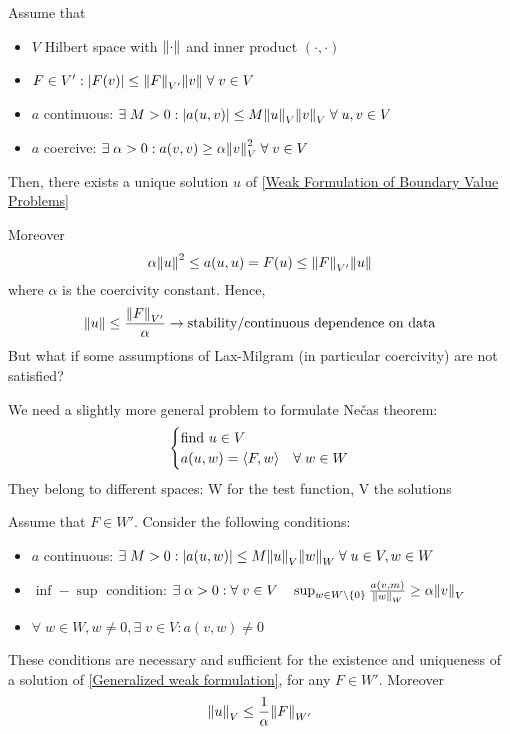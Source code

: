 \begin{theorem}
    Assume that 
    \begin{itemize}
        \item \(V\) Hilbert space with \(\norm{\cdot}\) and inner product \((\cdot, \cdot)\)
        \item \(F \in V': \abs{F(v)} \leq \norm{F}_{V'}\norm{v} \; \forall \; v \in V\)
        \item \(a\) continuous: \(\exists \; M > 0: \abs{a(u,v)} \leq M \norm{u}_V\norm{v}_V \; \forall \; u,v \in V\)
        \item \(a\) coercive: \(\exists \; \alpha > 0: a(v,v) \geq \alpha\norm{v}_V^2 \; \forall \; v \in V\)
    \end{itemize}
    Then, there exists a unique solution \(u\) of \eqref{Weak Formulation of Boundary Value Problems}
\end{theorem}
Moreover 
\[
    \alpha \norm{u}^2 \leq a(u,u) = F(u) \leq \norm{F}_{V'} \norm{u}
\]
where \(\alpha\) is the coercivity constant. Hence,
\[
    \norm{u} \leq \frac{\norm{F}_{V'}}{\alpha} \to \text{stability/continuous dependence on data}
\]
But what if some assumptions of Lax-Milgram (in particular coercivity) are not satisfied?

We need a slightly more general problem to formulate Nečas theorem:
\begin{equation}
    \begin{cases}
        \text{find } u \in V \\
        a(u,w) = \langle F,w \rangle & \forall \; w \in W \label{Generalized weak formulation}
    \end{cases}
\end{equation}
They belong to different spaces: W for the test function, V the solutions
\begin{theorem}[Nečas]
    Assume that \(F \in W'\). Consider the following conditions:
    \begin{itemize}
        \item \(a\) continuous: \(\exists \; M > 0: \abs{a(u,w)} \leq M \norm{u}_V \norm{w}_W \; \forall \; u \in V, w \in W\)
        \item \(\inf-\sup\) condition: \(\exists \; \alpha > 0: \forall \; v \in V \quad \sup_{w \in W \setminus \left\{0\right\}} \frac{a(v,m)}{\norm{w}_W} \geq \alpha \norm{v}_V\)
        \item \(\forall \; w \in W, w \neq 0, \exists \; v \in V : a(v,w) \neq 0\)
    \end{itemize}
    These conditions are necessary and sufficient for the existence and uniqueness of a solution of \ref*{Generalized weak formulation}, for any \(F \in W'\). Moreover 
    \[
        \norm{u}_V \leq \frac{1}{\alpha}\norm{F}_{W'}
    \]
\label{Nečas}
\end{theorem}


